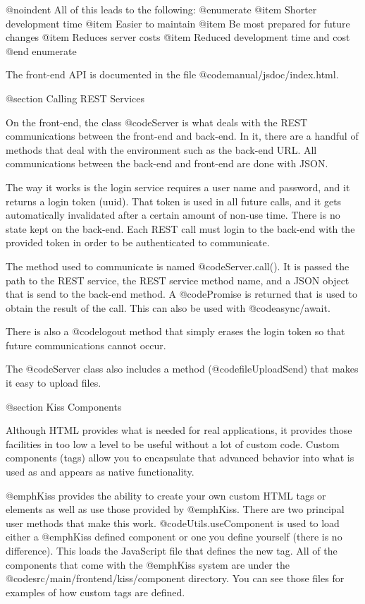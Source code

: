 @noindent
All of this leads to the following:
@enumerate
@item
Shorter development time
@item 
Easier to maintain
@item
Be most prepared for future changes
@item
Reduces server costs
@item
Reduced development time and cost
@end enumerate

The front-end API is documented in the file @code{manual/jsdoc/index.html}.



@section Calling REST Services

On the front-end, the class @code{Server} is what deals with the REST
communications between the front-end and back-end.  In it, there are a
handful of methods that deal with the environment such as the back-end
URL.  All communications between the back-end and front-end are done
with JSON.

The way it works is the login service requires a user name and
password, and it returns a login token (uuid).  That token is used in
all future calls, and it gets automatically invalidated after a certain
amount of non-use time.  There is no state kept on the back-end.  Each
REST call must login to the back-end with the provided token in order
to be authenticated to communicate.

The method used to communicate is named @code{Server.call()}. It is passed the
path to the REST service, the REST service method name, and a JSON
object that is send to the back-end method.  A @code{Promise} is
returned that is used to obtain the result of the call.  This
can also be used with @code{async/await}.

There is also a @code{logout} method that simply erases the
login token so that future communications cannot occur.

The @code{Server} class also includes a method (@code{fileUploadSend})
that makes it easy to upload files.

@section Kiss Components


Although HTML provides what is needed for real applications, it
provides those facilities in too low a level to be useful without a
lot of custom code.  Custom components (tags) allow you to encapsulate
that advanced behavior into what is used as and appears as native
functionality.

@emph{Kiss} provides the ability to create your own custom HTML tags
or elements as well as use those provided by @emph{Kiss}.  There are
two principal user methods that make this work.
@code{Utils.useComponent} is used to load either a @emph{Kiss} defined
component or one you define yourself (there is no difference).  This
loads the JavaScript file that defines the new tag.  All of the
components that come with the @emph{Kiss} system are under the
@code{src/main/frontend/kiss/component} directory.  You can see those
files for examples of how custom tags are defined.


